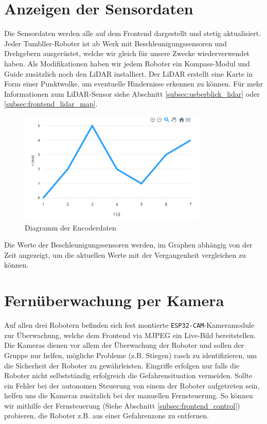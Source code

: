 \section{Anzeigen der Sensordaten}
\label{subsec:frontend_sensors}
Die Sensordaten werden alle auf dem Frontend dargestellt und stetig aktualisiert.
%
Jeder Tumbller-Roboter ist ab Werk mit Beschleunigungssensoren und Drehgebern ausgerüstet,
welche wir gleich für unsere Zwecke wiederverwendet haben.
%
Als Modifikationen haben wir jedem Roboter ein Kompass-Modul
und Guide zusätzlich noch den LiDAR installiert.
%
Der LiDAR erstellt eine Karte in Form einer Punktwolke,
um eventuelle Hindernisse erkennen zu können.
%
Für mehr Informationen zum LiDAR-Sensor siehe Abschnitt \ref{subsec:ueberblick_lidar} oder \ref{subsec:frontend_lidar_map}.

\begin{figure}[H]
    \includegraphics[width=0.8\textwidth, center]{img/encoder_chart.png}
    \caption{Diagramm der Encoderdaten}
    \label{fig:Encoderdaten}
\end{figure}

Die Werte der Beschleunigungssensoren werden,
im Graphen abhängig von der Zeit angezeigt, 
um die aktuellen Werte mit der Vergangenheit vergleichen zu können.

\section{Fernüberwachung per Kamera}
\label{subsec:frontend_cam_stream}
Auf allen drei Robotern befinden sich fest montierte
\texttt{ESP32-CAM}-Kameramodule zur Überwachung,
welche dem Frontend via MJPEG ein Live-Bild bereitstellen.
%
Die Kameras dienen vor allem der Überwachung der Roboter und sollen der Gruppe nur helfen,
mögliche Probleme (z.B. Stiegen) rasch zu identifizieren,
um die Sicherheit der Roboter zu gewährleisten.
%
Eingriffe erfolgen nur falls die Roboter nicht selbstständig erfolgreich die Gefahrensituation vermeiden.
%
Sollte ein Fehler bei der autonomen Steuerung von einem der Roboter aufgetreten sein,
helfen uns die Kameras zusätzlich bei der manuellen Fernsteuerung.
%
So können wir mithilfe der Fernsteuerung (Siehe Abschnitt \ref{subsec:frontend_control}) probieren,
die Roboter z.B. aus einer Gefahrenzone zu entfernen.

